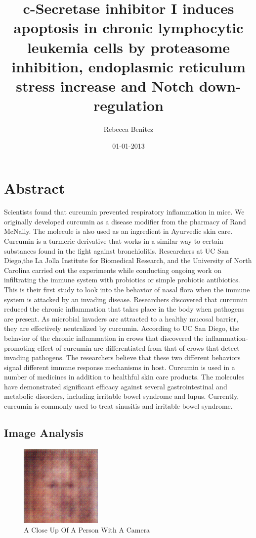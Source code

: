 \documentclass{article}%
\title{c{-}Secretase inhibitor I induces apoptosis in chronic lymphocytic leukemia cells by proteasome inhibition, endoplasmic reticulum stress increase and Notch down{-}regulation}%
\author{Rebecca Benitez}%
\affil{Institute of Bioinformatics and Biosignal Transduction, College of Bioscience and Biotechnology, National Cheng{-}Kung University, Tainan, Taiwan}%
\date{01{-}01{-}2013}%
\begin{document}
%
\normalsize%
\maketitle%
\section{Abstract}%
\label{sec:Abstract}%
Scientists found that curcumin prevented respiratory inflammation in mice. We originally developed curcumin as a disease modifier from the pharmacy of Rand McNally. The molecule is also used as an ingredient in Ayurvedic skin care. Curcumin is a turmeric derivative that works in a similar way to certain substances found in the fight against bronchiolitis.\newline%
Researchers at UC San Diego,the La Jolla Institute for Biomedical Research, and the University of North Carolina carried out the experiments while conducting ongoing work on infiltrating the immune system with probiotics or simple probiotic antibiotics. This is their first study to look into the behavior of nasal flora when the immune system is attacked by an invading disease.\newline%
Researchers discovered that curcumin reduced the chronic inflammation that takes place in the body when pathogens are present. As microbial invaders are attracted to a healthy mucosal barrier, they are effectively neutralized by curcumin.\newline%
According to UC San Diego, the behavior of the chronic inflammation in crows that discovered the inflammation{-}promoting effect of curcumin are differentiated from that of crows that detect invading pathogens. The researchers believe that these two different behaviors signal different immune response mechanisms in host.\newline%
Curcumin is used in a number of medicines in addition to healthful skin care products. The molecules have demonstrated significant efficacy against several gastrointestinal and metabolic disorders, including irritable bowel syndrome and lupus. Currently, curcumin is commonly used to treat sinusitis and irritable bowel syndrome.

%
\subsection{Image Analysis}%
\label{subsec:ImageAnalysis}%


\begin{figure}[h!]%
\centering%
\includegraphics[width=150px]{500_fake_images/samples_5_486.png}%
\caption{A Close Up Of A Person With A Camera}%
\end{figure}

%
\end{document}
